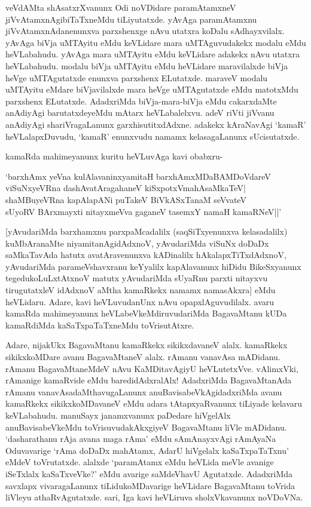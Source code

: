 veVdAMta shAsatxrXvanunx Odi noVDidare paramAtamxneV jiVvAtamxnAgibiTaTxneMdu tiLiyutatxde. yAvAga paramAtamxnu jiVvAtamxnAdanenunxva parxshenxge nAvu utatxra koDalu sAdhayxvilalx. yAvAga biVja uMTAyitu eMdu keVLidare mara uMTAguvudakekx modalu eMdu heVLabahudu. yAvAga mara uMTAyitu eMdu keVLidare adakekx nAvu utatxra heVLabahudu. modalu biVja uMTAyitu eMdu heVLidare maravilalxde biVja heVge uMTAgutatxde enunxva parxshenx ELutatxde. maraveV modalu uMTAyitu eMdare biVjavilalxde mara heVge uMTAgutatxde eMdu matotxMdu parxshenx ELutatxde. AdadxriMda biVja-mara-biVja eMdu cakarxdaMte anAdiyAgi barutatxdeyeMdu mAtarx heVLabalelxvu. adeV riVti jiVvanu anAdiyAgi shariVragaLanunx garxhisutitxdAdxne. adakekx kAraNavAgi `kamaR' heVLalapxDuvudu, `kamaR' enunxvudu namamx kelasagaLanunx sUcisutatxde.

kamaRda mahimeyanunx kuritu heVLuvAga kavi obabxru-

\begin{shloka}
`barxhAmx yeVna kulAlavaninxyamitaH barxhAmxMDaBAMDoVdareV\\
viSuNxyeVRna dashAvatAragahaneV kiSxpotxVmahAsaMkaTeV|\\
shaMBuyeVRna kapAlapANi puTakeV BiVkASxTanaM seVvateV\\
sUyoRV BArxmayxti nitayxmeVva gaganeV tasemxY namaH kamaRNeV||'
\end{shloka}

[yAvudariMda barxhamxnu parxpaMcadalilx (saqSiTxyenunxva kelasadalilx) kuMbAranaMte niyamitanAgidAdxnoV, yAvudariMda viSuNx doDaDx saMkaTavAda hatutx avatAravenunxva kADinalilx hAkalapxTiTxdAdxnoV, yAvudariMda parameVshavxranu keYyalilx kapAlavanunx hiDidu BikeSxyanunx tegedukoLuLxtAtxnoV matutx yAvudariMda sUyaRnu parxti nitayxvu tirugutatxleV idAdxnoV aMtha kamaRkekx namamx namasAkxra] eMdu heVLidaru. Adare, kavi heVLuvudanUnx nAvu opapxlAguvudilalx. avaru kamaRda mahimeyanunx heVLabeVkeMdiruvudariMda BagavaMtanu kUDa kamaRdiMda kaSaTxpaTaTxneMdu toVrisutAtxre.

Adare, nijakUkx BagavaMtanu kamaRkekx sikikxdavaneV alalx. kamaRkekx sikikxkoMDare avanu BagavaMtaneV alalx. rAmanu vanavAsa mADidanu. rAmanu BagavaMtaneMdeV nAvu KaMDitavAgiyU heVLutetxVve. vAlimxVki, rAmanige kamaRvide eMdu baredidAdxralAlx! AdadxriMda BagavaMtanAda rAmanu vanavAsadaMthavugaLanunx anuBavisabeVkAgidadxriMda avanu kamaRkekx sikikxkoMDavaneV eMdu adara tAtapxyaRvanunx tiLiyade kelavaru keVLabahudu. manuSayx janamxvanunx paDedare hiVgelAlx anuBavisabeVkeMdu toVrisuvudakAkxgiyeV BagavaMtanu liVle mADidanu. `dasharathanu rAja avana maga rAma' eMdu sAmAnayxvAgi rAmAyaNa Oduvavarige `rAma doDaDx mahAtamx, AdarU hiVgelalx kaSaTxpaTaTxnu' eMdeV toVrutatxde. alalxde `paramAtamx eMdu heVLida meVle avanige iSeTxlalx kaSaTxveVke?' eMdu avarige saMdeVhavU Agutatxde. AdadxriMda savxlapx vivaragaLanunx tiLidukoMDavarige heVLidare BagavaMtanu toVrida liVleyu athaRvAgutatxde. sari, Iga kavi heVLiruva sholxVkavanunx noVDoVNa.

